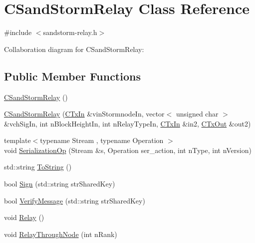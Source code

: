 \hypertarget{class_c_sand_storm_relay}{}\section{C\+Sand\+Storm\+Relay Class Reference}
\label{class_c_sand_storm_relay}


{\ttfamily \#include $<$sandstorm-\/relay.\+h$>$}



Collaboration diagram for C\+Sand\+Storm\+Relay\+:
\subsection*{Public Member Functions}
\begin{DoxyCompactItemize}
\item 
\hyperlink{class_c_sand_storm_relay_a160bb012209e966517008f4ac568d6e6}{C\+Sand\+Storm\+Relay} ()
\item 
\hyperlink{class_c_sand_storm_relay_a4d0da1c322375def1ed4da99aa8289a3}{C\+Sand\+Storm\+Relay} (\hyperlink{class_c_tx_in}{C\+Tx\+In} \&vin\+Stormnode\+In, vector$<$ unsigned char $>$ \&vch\+Sig\+In, int n\+Block\+Height\+In, int n\+Relay\+Type\+In, \hyperlink{class_c_tx_in}{C\+Tx\+In} \&in2, \hyperlink{class_c_tx_out}{C\+Tx\+Out} \&out2)
\item 
{\footnotesize template$<$typename Stream , typename Operation $>$ }\\void \hyperlink{class_c_sand_storm_relay_a8fba7af50034e76090056c3bed8b7378}{Serialization\+Op} (Stream \&s, Operation ser\+\_\+action, int n\+Type, int n\+Version)
\item 
std\+::string \hyperlink{class_c_sand_storm_relay_aca18b7e41e812d174624d15730451333}{To\+String} ()
\item 
bool \hyperlink{class_c_sand_storm_relay_a7263335082b2638b8eafc59e21e79baa}{Sign} (std\+::string str\+Shared\+Key)
\item 
bool \hyperlink{class_c_sand_storm_relay_add9d29eac76800e8d07ced2e0b3eec4b}{Verify\+Message} (std\+::string str\+Shared\+Key)
\item 
void \hyperlink{class_c_sand_storm_relay_a267e6fecd0b7381cfe31c75fba023129}{Relay} ()
\item 
void \hyperlink{class_c_sand_storm_relay_aae4c929f8831a4c678812b1da8f82a55}{Relay\+Through\+Node} (int n\+Rank)
\end{DoxyCompactItemize}
